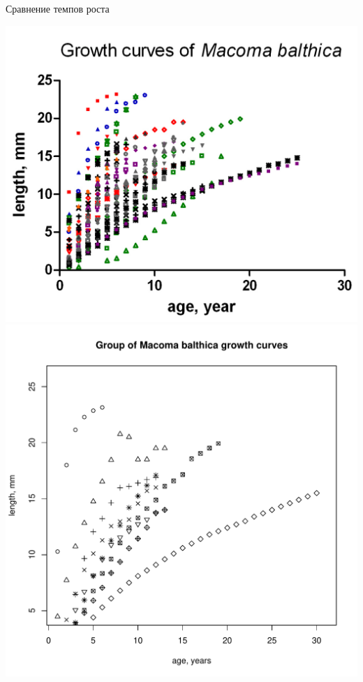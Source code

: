\documentclass{beamer}
\begin{document}
\begin{frame}{Сравнение темпов роста}
	\begin{minipage}[t]{.6\linewidth}
\begin{center}
			\includegraphics[height=.45\textheight]{curves_Macoma_pict.jpg}\\
			\includegraphics[height=.45\textheight]{clusters_literature.pdf}

\end{center}
\end{minipage}
\end{frame}
\end{document}
